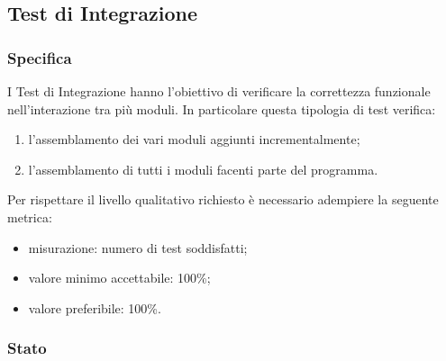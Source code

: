 \subsection{Test di Integrazione}

	\subsubsection{Specifica}
		I Test di Integrazione hanno l'obiettivo di verificare la correttezza funzionale nell’interazione tra più moduli. In particolare questa tipologia di test verifica:
		\begin{enumerate}
			\item{l'assemblamento dei vari moduli aggiunti incrementalmente;}
			\item{l'assemblamento di tutti i moduli facenti parte del programma.}
		\end{enumerate}
		Per rispettare il livello qualitativo richiesto è necessario adempiere la seguente metrica:
		\begin{itemize}
			\item{misurazione: numero di test soddisfatti;}
			\item{valore minimo accettabile: 100\%;}
			\item{valore preferibile: 100\%.}
		\end{itemize}


	\subsubsection{Stato}
		
